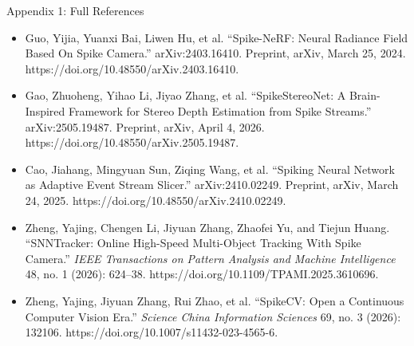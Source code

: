 \documentclass[final]{beamer}
\begin{document}
\begin{frame}[t]{Appendix 1: Full References}
\begin{center}
\begin{minipage}{0.85\linewidth}
\begin{itemize}
\item[\hypertarget{ref:6}{\textbf{[6]}}] Guo, Yijia, Yuanxi Bai, Liwen Hu, et al. “Spike-NeRF: Neural Radiance Field Based On Spike Camera.” arXiv:2403.16410. Preprint, arXiv, March 25, 2024. https://doi.org/10.48550/arXiv.2403.16410.
\item[\hypertarget{ref:7}{\textbf{[7]}}] Gao, Zhuoheng, Yihao Li, Jiyao Zhang, et al. “SpikeStereoNet: A Brain-Inspired Framework for Stereo Depth Estimation from Spike Streams.” arXiv:2505.19487. Preprint, arXiv, April 4, 2026. https://doi.org/10.48550/arXiv.2505.19487.
\item[\hypertarget{ref:8}{\textbf{[8]}}] Cao, Jiahang, Mingyuan Sun, Ziqing Wang, et al. “Spiking Neural Network as Adaptive Event Stream Slicer.” arXiv:2410.02249. Preprint, arXiv, March 24, 2025. https://doi.org/10.48550/arXiv.2410.02249.
\item[\hypertarget{ref:9}{\textbf{[9]}}] Zheng, Yajing, Chengen Li, Jiyuan Zhang, Zhaofei Yu, and Tiejun Huang. “SNNTracker: Online High-Speed Multi-Object Tracking With Spike Camera.” \textit{IEEE Transactions on Pattern Analysis and Machine Intelligence} 48, no. 1 (2026): 624–38. https://doi.org/10.1109/TPAMI.2025.3610696.
\item[\hypertarget{ref:10}{\textbf{[10]}}] Zheng, Yajing, Jiyuan Zhang, Rui Zhao, et al. “SpikeCV: Open a Continuous Computer Vision Era.” \textit{Science China Information Sciences} 69, no. 3 (2026): 132106. https://doi.org/10.1007/s11432-023-4565-6.
\end{itemize}
\end{minipage}
\end{center}

\end{frame}
\end{document}
